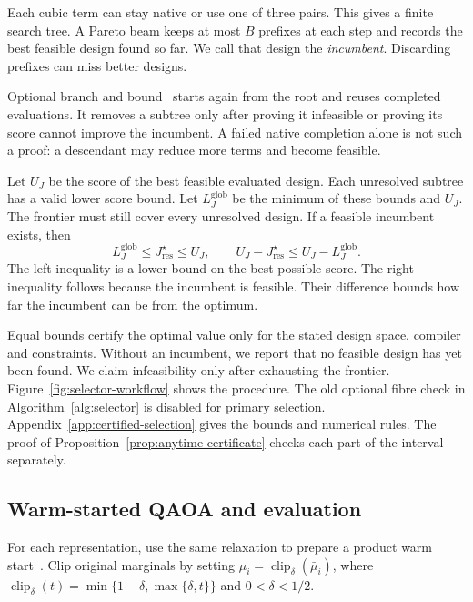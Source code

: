 \documentclass[a4paper,onecolumn,11pt,unpublished]{quantumarticle}
\theoremstyle{remark}
\begin{document}
Each cubic term can stay native or use one of three pairs.
This gives a finite search tree. A Pareto beam keeps at most $B$ prefixes
at each step and records the best feasible design found so far.
We call that design the \emph{incumbent}.
Discarding prefixes can miss better designs.

Optional branch and bound~\cite{LandDoig1960,LawlerWood1966} starts again
from the root and reuses completed evaluations.
It removes a subtree only after proving it infeasible or proving its score
cannot improve the incumbent. A failed native completion alone is not
such a proof: a descendant may reduce more terms and become feasible.

Let $U_J$ be the score of the best feasible evaluated design.
Each unresolved subtree has a valid lower score bound.
Let $L_J^{\mathrm{glob}}$ be the minimum of these bounds and $U_J$.
The frontier must still cover every unresolved design.
If a feasible incumbent exists, then
\begin{equation}
L_J^{\mathrm{glob}}\leq J_{\mathrm{res}}^\star\leq U_J,
\qquad U_J-J_{\mathrm{res}}^\star\leq U_J-L_J^{\mathrm{glob}}.
\label{eq:anytime-certificate}
\end{equation}
The left inequality is a lower bound on the best possible score.
The right inequality follows because the incumbent is feasible.
Their difference bounds how far the incumbent can be from the optimum.

Equal bounds certify the optimal value only for the stated design space,
compiler and constraints. Without an incumbent, we report that no feasible
design has yet been found. We claim infeasibility only after exhausting
the frontier.
Figure~\ref{fig:selector-workflow} shows the procedure.
The old optional fibre check in Algorithm~\ref{alg:selector} is disabled
for primary selection.
Appendix~\ref{app:certified-selection} gives the bounds and numerical rules.
The proof of Proposition~\ref{prop:anytime-certificate} checks each part
of the interval separately.

\subsection{Warm-started QAOA and evaluation}
\label{sec:warm-start}
\label{sec:warm-start-state}
\label{sec:ws-qaoa}
\label{sec:cost-consistency}

For each representation, use the same relaxation to prepare a product
warm start~\cite{Egger2021,TateSDP2023,TateCustom2023}.
Clip original marginals by setting $\mu_i=\operatorname{clip}_\delta(\bar\mu_i)$,
where $\operatorname{clip}_\delta(t)=\min\{1-\delta,\max\{\delta,t\}\}$
and $0<\delta<1/2$.
\end{document}
